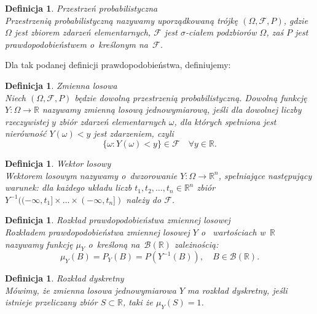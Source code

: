 \documentclass[12pt,a4paper]{report}
\newtheorem{definition}[theorem]{Definicja}
\begin{document}
\begin{definition}{Przestrzeń probabilistyczna \cite[w o~parciu o~ rozdział 1.2]{krysicki1999}}\\
Przestrzenią probabilistyczną nazywamy uporządkowaną trójkę $(\Omega, \mathcal{F}, P)$, gdzie $\Omega$ jest zbiorem zdarzeń elementarnych, $\mathcal{F}$ jest $\sigma$-ciałem podzbiorów $\Omega$, zaś $P$ jest prawdopodobieństwem o~kreślonym na~$\mathcal{F}$.
\end{definition}

Dla tak podanej definicji prawdopodobieństwa, definiujemy:

\begin{definition}{Zmienna losowa \cite[Rozdział 2.1]{krysicki1999}}\\
Niech $(\Omega, \mathcal{F}, P)$ będzie dowolną przestrzenią probabilistyczną. Dowolną funkcję $\textit{Y} : \Omega \rightarrow \mathbb{R}$ nazywamy zmienną losową jednowymiarową, jeśli dla dowolnej liczby rzeczywistej $y$ zbiór zdarzeń elementarnych $\omega$, dla których spełniona jest nierówność $Y(\omega)< y$ jest zdarzeniem, czyli 
$$\{\omega: Y(\omega) < y \} \in \mathcal{F}\quad \forall y \in \mathbb{R}.$$

\end{definition}


\begin{definition}{Wektor losowy \cite[Rozdział 5.1]{jakubowski2004}}\\
Wektorem losowym nazywamy o~dwzorowanie $Y:\Omega \rightarrow \mathbb{R}^n$, spełniające następujący warunek: dla każdego układu liczb $t_1,t_2,\ldots,t_n \in \mathbb{R}^n$ zbiór $Y^{-1}((-\infty,t_1]\times \ldots \times(-\infty,t_n])$ należy do $\mathcal{F}$.
\end{definition}


\begin{definition}{Rozkład prawdopodobieństwa zmiennej losowej \cite[Rozdział 5.1]{jakubowski2004}}\\
Rozkładem prawdopodobieństwa zmiennej losowej $Y$ o~ wartościach w~$\mathbb{R}$ nazywamy funkcję $\mu_Y$ o~kreśloną na~$\mathcal{B}(\mathbb{R})$ zależnością:
$$\mu_Y(B)=P_Y(B)=P(Y^{-1}(B)), \quad B \in \mathcal{B}(\mathbb{R}).$$
 
\end{definition}


\begin{definition}{Rozkład dyskretny \cite[Rozdział 5.1]{jakubowski2004}}\\
Mówimy, że zmienna losowa jednowymiarowa $Y$ ma rozkład dyskretny, jeśli istnieje przeliczany zbiór $S \subset \mathbb{R}$, taki że $\mu_Y(S)=1$.
\end{definition}
\end{document}
